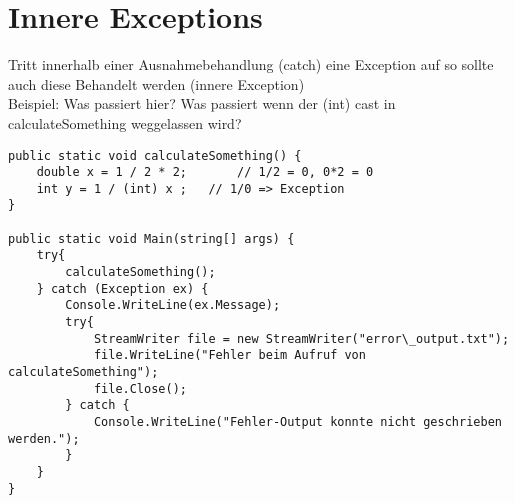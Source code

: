 \section{Innere Exceptions}
Tritt innerhalb einer Ausnahmebehandlung (catch) eine Exception auf so sollte auch diese Behandelt werden (innere Exception)\bigskip\\
Beispiel: Was passiert hier?  Was passiert wenn der (int) cast in calculateSomething weggelassen wird?
\begin{lstlisting}[language={[Sharp]C}]
public static void calculateSomething() {
	double x = 1 / 2 * 2;		// 1/2 = 0, 0*2 = 0
	int y = 1 / (int) x ;	// 1/0 => Exception
}

public static void Main(string[] args) {
	try{
		calculateSomething();
	} catch (Exception ex) {
		Console.WriteLine(ex.Message);
		try{
			StreamWriter file = new StreamWriter("error\_output.txt");
			file.WriteLine("Fehler beim Aufruf von calculateSomething");
			file.Close();  
		} catch {
			Console.WriteLine("Fehler-Output konnte nicht geschrieben werden.");
		}
	}
}
\end{lstlisting}

